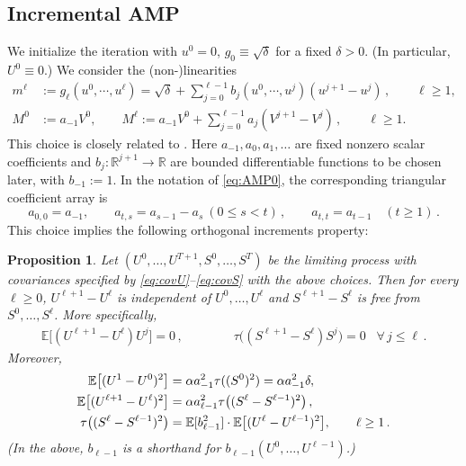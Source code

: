 \documentclass[11pt]{article}
\newtheorem{proposition}[theorem]{Proposition}
\theoremstyle{definition}
\theoremstyle{remark}
\numberwithin{equation}{section}
\numberwithin{theorem}{section}
\newcommand{\R}{\mathbb R}
\newcommand{\E}{\mathbb E}
\newcommand{\taup}{\tau}
\begin{document}
\subsection{Incremental AMP}\label{subsec:incremental_amp}
We initialize the iteration with $u^0 = 0$, $g_0 \equiv \sqrt{\delta}$ for a fixed $\delta>0$. (In particular, $U^0 \equiv 0$.) We consider the (non-)linearities
\begin{align}\label{eq:choice_non_linearities}
m^{\ell} &:= g_{\ell}(u^0,\cdots,u^\ell) =  \sqrt{\delta} + \sum_{j=0}^{\ell-1} b_j(u^0,\cdots,u^j) (u^{j+1}-u^{j})\,, \qquad \ell\ge1, \\ 
M^0&:=a_{-1}V^0,\qquad
M^{\ell} :=a_{-1}V^0+\sum_{j=0}^{\ell-1} a_j (V^{j+1}-V^{j})\,,
\qquad \ell\ge1.
\end{align}
This choice is closely related to \cite{ams2020}.  
Here $a_{-1},a_0, a_1, \ldots$ are fixed nonzero scalar coefficients and $b_j:\R^{j+1}\to \R$ are bounded differentiable functions to be chosen later, with $b_{-1}:=1$. 
In the notation of \eqref{eq:AMP0}, the corresponding triangular
coefficient array is
\begin{equation}\label{eq:incremental-coefficient-array}
 a_{0,0}=a_{-1},
 \qquad
 a_{t,s}=a_{s-1}-a_s\ (0\le s<t)\,, 
 \qquad
 a_{t,t}=a_{t-1}\quad(t\ge1)\,.
\end{equation}
This choice implies the following orthogonal increments property: 
%
\begin{proposition}\label{prop:orthogonal_increments}
	Let $(U^0,\ldots,U^{T+1},S^0,\ldots,S^T)$ be the limiting process with covariances specified by \eqref{eq:covU}--\eqref{eq:covS} with the above choices. Then for every $\ell\ge 0$, $U^{\ell+1} - U^{\ell}$ is independent of $U^0, \ldots, U^{\ell}$ and $S^{\ell+1} - S^{\ell}$ is free from $S^0, \ldots, S^{\ell}$. More specifically,
	\begin{align}\label{eq:covariance_independent_increments}
\E\big[ (U^{\ell+1} - U^{\ell}) U^j \big] = 0 \,,\qquad\qquad \taup\big( (S^{\ell+1} - S^{\ell}) S^j \big) = 0 \,~~~\forall\, j \le \ell\,.
\end{align}
Moreover,
 \begin{align}\label{eq:variance_increments}
\E\big[ (U^{1} - U^{0})^2 \big]
&= \alpha a_{-1}^2\taup((S^0)^2)=\alpha a_{-1}^2\delta,\notag\\
\E\big[ (U^{\ell+1} - U^{\ell})^2 \big]
&= \alpha a_{\ell-1}^2
\taup\big( (S^{\ell} - S^{\ell-1})^2 \big)\,,\\
\taup \big( (S^{\ell} - S^{\ell-1})^2 \big)
&= \E[b_{\ell-1}^2]\cdot\E\big[ (U^{\ell} - U^{\ell-1})^2 \big],
\qquad \ell\ge1\,.\notag
\end{align}
(In the above, $b_{\ell-1}$ is a shorthand for $b_{\ell-1}(U^0,\ldots,U^{\ell-1})$.)
\end{proposition}
\end{document}
